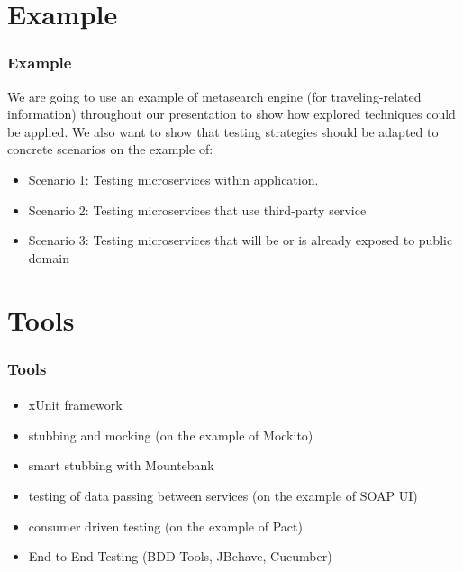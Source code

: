 \documentclass{beamer}
\begin{document}
\section{Example}
\begin{frame}
	\frametitle{Example}
	We are going to use an example of metasearch engine (for traveling-related information) throughout our presentation to show how explored techniques could be applied. 
	We also want to show that testing strategies should be adapted to concrete scenarios on the example of:
	\begin{itemize}	
 		\item Scenario 1: Testing microservices within application.
		\item Scenario 2: Testing microservices that use third-party service
		\item Scenario 3: Testing microservices that will be or is already exposed to public domain
	\end{itemize}
\end{frame}


\section{Tools}

\begin{frame}
	\frametitle{Tools}
	\framesubtitle{}
	\begin{itemize}
		\item xUnit framework
		\item stubbing and mocking (on the example of Mockito)
		\item smart stubbing with Mountebank
		\item testing of data passing between services (on the example of SOAP UI)
		\item consumer driven testing (on the example of Pact)
		\item End-to-End Testing (BDD Tools, JBehave, Cucumber)
	\end{itemize}
\end{frame}
\end{document}
